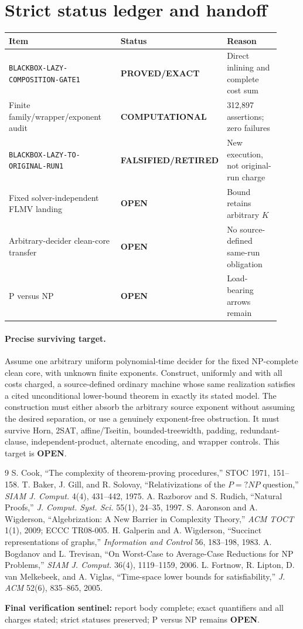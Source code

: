 \documentclass[11pt]{article}
\newcommand{\EXACT}{\textbf{PROVED/EXACT}}
\newcommand{\COMP}{\textbf{COMPUTATIONAL}}
\newcommand{\OPEN}{\textbf{OPEN}}
\newcommand{\RETIRED}{\textbf{FALSIFIED/RETIRED}}
\begin{document}
\section{Strict status ledger and handoff}
\begin{center}
\begin{tabular}{p{0.48\linewidth}p{0.19\linewidth}p{0.25\linewidth}}
\toprule
Item & Status & Reason \\
\midrule
\texttt{BLACKBOX-LAZY-COMPOSITION-GATE1} & \EXACT & Direct inlining and complete cost sum\\
Finite family/wrapper/exponent audit & \COMP & 312,897 assertions; zero failures\\
\texttt{BLACKBOX-LAZY-TO-ORIGINAL-RUN1} & \RETIRED & New execution, not original-run charge\\
Fixed solver-independent FLMV landing & \OPEN & Bound retains arbitrary \(K\)\\
Arbitrary-decider clean-core transfer & \OPEN & No source-defined same-run obligation\\
P versus NP & \OPEN & Load-bearing arrows remain\\
\bottomrule
\end{tabular}
\end{center}

\paragraph{Precise surviving target.}
Assume one arbitrary uniform polynomial-time decider for the fixed
NP-complete clean core, with unknown finite exponents.  Construct, uniformly
and with all costs charged, a source-defined ordinary machine whose same
realization satisfies a cited unconditional lower-bound theorem in exactly
its stated model.  The construction must either absorb the arbitrary source
exponent without assuming the desired separation, or use a genuinely
exponent-free obstruction.  It must survive Horn, 2SAT, affine/Tseitin,
bounded-treewidth, padding, redundant-clause, independent-product, alternate
encoding, and wrapper controls.  This target is \OPEN.

\begin{thebibliography}{9}
 S. Cook, ``The complexity of theorem-proving procedures,''
STOC 1971, 151--158.
 T. Baker, J. Gill, and R. Solovay,
``Relativizations of the \(P=?NP\) question,'' \emph{SIAM J. Comput.} 4(4),
431--442, 1975.
 A. Razborov and S. Rudich, ``Natural Proofs,''
\emph{J. Comput. Syst. Sci.} 55(1), 24--35, 1997.
 S. Aaronson and A. Wigderson,
``Algebrization: A New Barrier in Complexity Theory,'' \emph{ACM TOCT} 1(1),
2009; ECCC TR08-005.
 H. Galperin and A. Wigderson,
``Succinct representations of graphs,'' \emph{Information and Control} 56,
183--198, 1983.
 A. Bogdanov and L. Trevisan,
``On Worst-Case to Average-Case Reductions for NP Problems,''
\emph{SIAM J. Comput.} 36(4), 1119--1159, 2006.
 L. Fortnow, R. Lipton, D. van Melkebeek, and A. Viglas,
``Time-space lower bounds for satisfiability,'' \emph{J. ACM} 52(6),
835--865, 2005.
\end{thebibliography}

\noindent\textbf{Final verification sentinel:} report body complete; exact
quantifiers and all charges stated; strict statuses preserved; P versus NP
remains \OPEN.
\end{document}

